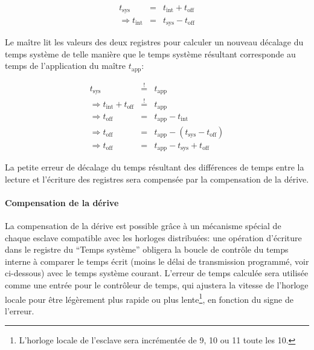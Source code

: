 \documentclass[a4paper,12pt,BCOR=6mm,bibtotoc,idxtotoc]{scrbook}
\begin{document}
\begin{eqnarray}
t_\text{sys} & = & t_\text{int} + t_\text{off} \\
\Rightarrow t_\text{int} & = & t_\text{sys} - t_\text{off} \nonumber
\end{eqnarray}

Le ma\^itre lit les valeurs des deux registres pour calculer un nouveau
d\'ecalage du temps syst\`eme de telle mani\`ere que
le temps syst\`eme r\'esultant corresponde au temps de l'application du
ma\^itre $t_\text{app}$:

\begin{eqnarray}
t_\text{sys} & \stackrel{!}{=} & t_\text{app} \\
\Rightarrow t_\text{int} + t_\text{off} & \stackrel{!}{=} & t_\text{app} \nonumber \\
\Rightarrow t_\text{off} & = & t_\text{app} - t_\text{int} \nonumber \\
\Rightarrow t_\text{off} & = & t_\text{app} - (t_\text{sys} - t_\text{off}) \nonumber \\
\Rightarrow t_\text{off} & = & t_\text{app} - t_\text{sys} + t_\text{off}
\end{eqnarray}


La petite erreur de d\'ecalage du temps r\'esultant des diff\'erences
de temps entre la lecture et l'\'ecriture des registres sera compens\'ee
par la compensation de la d\'erive.

\paragraph{Compensation de la d\'erive} La compensation de la d\'erive
est possible gr\^ace \`a un m\'ecanisme sp\'ecial de chaque esclave
compatible avec les horloges distribu\'ees: une op\'eration
d'\'ecriture dans le registre du ``Temps syst\`eme'' obligera la boucle
de contr\^ole du temps interne \`a comparer le temps \'ecrit (moins le
d\'elai de transmission programm\'e, voir ci-dessous) avec le temps
syst\`eme courant.  L'erreur de temps calcul\'ee sera utilis\'ee comme
une entr\'ee pour le contr\^oleur de temps, qui ajustera la vitesse de
l'horloge locale pour \^etre l\'eg\`erement plus rapide ou plus
lente\footnote{ L'horloge locale de l'esclave sera incr\'ement\'ee de
\unit{9}{\nano\second}, \unit{10}{\nano\second} ou
\unit{11}{\nano\second} toute les \unit{10}{\nano\second}.}, en
fonction du signe de l'erreur.
\end{document}

